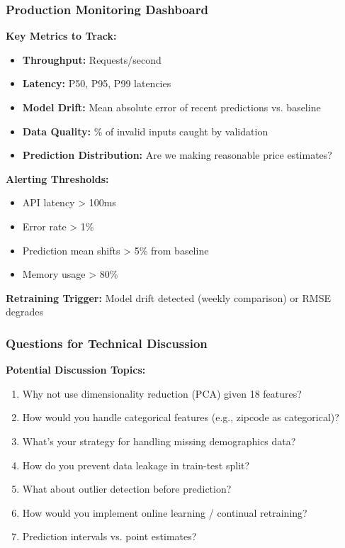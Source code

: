 \documentclass[aspectratio=169]{beamer}
\begin{document}
\begin{frame}
\frametitle{Production Monitoring Dashboard}

\textbf{Key Metrics to Track:}
\begin{itemize}
    \item \textbf{Throughput:} Requests/second
    \item \textbf{Latency:} P50, P95, P99 latencies
    \item \textbf{Model Drift:} Mean absolute error of recent predictions vs. baseline
    \item \textbf{Data Quality:} \% of invalid inputs caught by validation
    \item \textbf{Prediction Distribution:} Are we making reasonable price estimates?
\end{itemize}

\vspace{0.3cm}
\textbf{Alerting Thresholds:}
\begin{itemize}
    \item API latency > 100ms
    \item Error rate > 1\%
    \item Prediction mean shifts > 5\% from baseline
    \item Memory usage > 80\%
\end{itemize}

\vspace{0.3cm}
\textbf{Retraining Trigger:} Model drift detected (weekly comparison) or RMSE degrades
\end{frame}

\begin{frame}[fragile]
\frametitle{Questions for Technical Discussion}

\textbf{Potential Discussion Topics:}
\begin{enumerate}
    \item Why not use dimensionality reduction (PCA) given 18 features?
    \item How would you handle categorical features (e.g., zipcode as categorical)?
    \item What's your strategy for handling missing demographics data?
    \item How do you prevent data leakage in train-test split?
    \item What about outlier detection before prediction?
    \item How would you implement online learning / continual retraining?
    \item Prediction intervals vs. point estimates?
\end{enumerate}

\end{frame}
\end{document}
